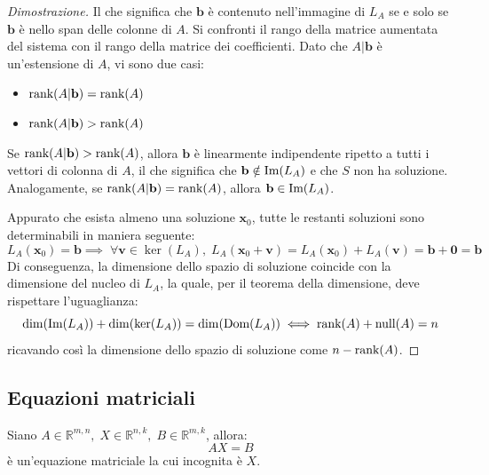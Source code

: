 \begin{proof}[Dimostrazione]
        \vspace{10pt}
        Il che significa che $\mathbf{b}$ è contenuto nell'immagine di $L_A$ se e solo se $\mathbf{b}$ è nello span delle colonne di $A$.
        Si confronti il rango della matrice aumentata del sistema con il rango della matrice dei coefficienti. Dato che $A | \mathbf{b}$ è un'estensione di $A$, vi sono due casi:
        \begin{itemize}
            \item $\textnormal{rank}{(A | \mathbf{b})} = \textnormal{rank}(A)$
            \item $\textnormal{rank}{(A | \mathbf{b})} > \textnormal{rank}(A)$
        \end{itemize}
        Se $\textnormal{rank}{(A | \mathbf{b})} > \textnormal{rank}(A)$, allora $\mathbf{b}$ è linearmente indipendente ripetto a tutti i vettori di colonna di $A$, il che significa
        che $\mathbf{b} \notin \textnormal{Im}(L_A)$ e che $S$ non ha soluzione. Analogamente, se $\textnormal{rank}{(A | \mathbf{b})} = \textnormal{rank}(A)$, allora $\mathbf{b} \in \textnormal{Im}(L_A)$.

        \vspace{10pt}
        Appurato che esista almeno una soluzione $\mathbf{x}_{0}$, tutte le restanti soluzioni sono determinabili in maniera seguente:
        \[
            L_A(\mathbf{x}_{0}) = \mathbf{b} \implies \; \forall \mathbf{v} \in \ker(L_A), \; L_A(\mathbf{x}_{0} + \mathbf{v}) = L_A(\mathbf{x}_{0}) + L_A(\mathbf{v}) = \mathbf{b} + \mathbf{0} = \mathbf{b}
        \]
        Di conseguenza, la dimensione dello spazio di soluzione coincide con la dimensione del nucleo di $L_A$, la quale, per il teorema della dimensione, deve rispettare l'uguaglianza:
        \[
            \dim(\textnormal{Im}(L_A)) + \dim(\ker(L_A)) = \dim(\textnormal{Dom}(L_A)) \iff \textnormal{rank}(A) + \textnormal{null}(A) = n
        \]
        ricavando così la dimensione dello spazio di soluzione come $n - \textnormal{rank}(A)$.
    \end{proof}




\subsection{Equazioni matriciali} \label{subsec:matequation}
    Siano $A \in \mathbb{R}^{m, n}, \; X \in \mathbb{R}^{n, k}, \; B \in \mathbb{R}^{m, k}$, allora:
    \[
        AX = B
    \]
    è un'equazione matriciale la cui incognita è $X$.

